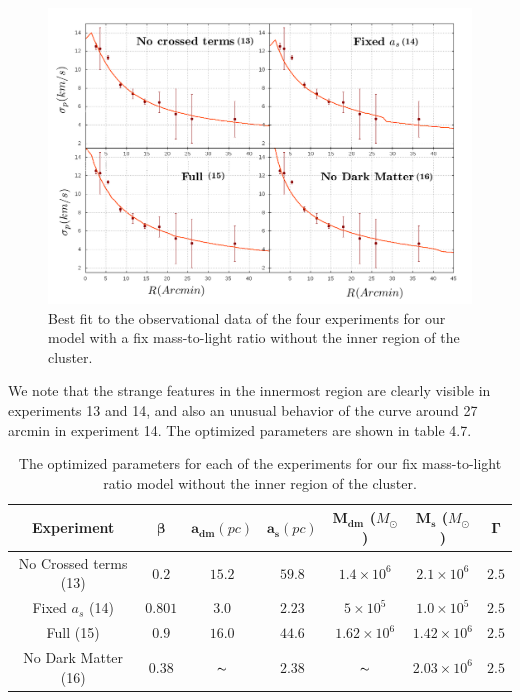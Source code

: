 \begin{figure}[H]
\centering
\includegraphics[width=15cm]{images/fix_gamma_refinado_10.png}
\caption[Best fit of our model with a fix mass-to-light ratio without the inner region]{Best fit to the observational data of the four experiments for our model with a fix mass-to-light ratio without the inner region of the cluster.}
\end{figure}

We note that the strange features in the innermost region are clearly visible in experiments 13 and 14, and also an unusual behavior of the curve around 27 arcmin in experiment 14. The optimized parameters are shown in table 4.7.

\begin{table}[H]
\centering
\begin{tabular}{| c| c| c| c| c| c| c|}
    \hline
    \textbf{Experiment} & $\mathbf{\beta}$ & $\mathbf{a_{dm}} (pc)$ & $\mathbf{a_{s}} (pc)$ & $\mathbf{M_{dm}}$ ($M_{\odot}$) & $\mathbf{M_{s}}$ ($M_{\odot}$) & $\mathbf{\Gamma}$\\ \hline
	No Crossed terms (13) & $0.2$ &	$15.2$ &	$59.8$ &	$1.4 \times 10^{6}$ &	$2.1 \times 10^{6}$ &	$2.5$\\ \hline
	Fixed $a_s$ (14) &	$0.801$ &	$3.0$ &	$2.23$ &	$5 \times 10^{5}$ &	$1.0 \times 10 ^{5}$ &	$2.5$\\ \hline
	Full (15) &	$0.9$ &	$16.0$ &	$44.6$ &	$1.62 \times 10^{6}$ &	$1.42 \times 10^{6}$ &	$2.5$\\ \hline
	No Dark Matter (16) &	$0.38$ &	$\thicksim$ & $ 2.38$ &	$\thicksim$ & $  2.03 \times 10^{6}$ & 	$2.5$\\
    \hline
  \end{tabular} 
\caption[Optimized parameters for our fix mass-to-light ratio model without the inner region.]{The optimized parameters for each of the experiments for our fix mass-to-light ratio model without the inner region of the cluster.}
\end{table} 


